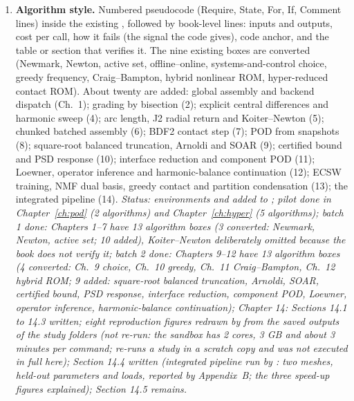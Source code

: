 \begin{enumerate}
\item \textbf{Algorithm style.} Numbered pseudocode (Require, State, For, If, Comment lines) inside the existing , followed by book-level lines: inputs and outputs, cost per call, how it fails (the signal the code gives), code anchor, and the table or section that verifies it. The nine existing boxes are converted (Newmark, Newton, active set, offline--online, systems-and-control choice, greedy frequency, Craig--Bampton, hybrid nonlinear ROM, hyper-reduced contact ROM). About twenty are added: global assembly and backend dispatch (Ch.~1); grading by bisection (2); explicit central differences and harmonic sweep (4); arc length, J2 radial return and Koiter--Newton (5); chunked batched assembly (6); BDF2 contact step (7); POD from snapshots (8); square-root balanced truncation, Arnoldi and SOAR (9); certified bound and PSD response (10); interface reduction and component POD (11); Loewner, operator inference and harmonic-balance continuation (12); ECSW training, NMF dual basis, greedy contact and partition condensation (13); the integrated pipeline (14). \emph{Status: environments  and  added to ; pilot done in Chapter~\ref{ch:pod} (2 algorithms) and Chapter~\ref{ch:hyper} (5 algorithms); batch 1 done: Chapters 1--7 have 13 algorithm boxes (3 converted: Newmark, Newton, active set; 10 added), Koiter--Newton deliberately omitted because the book does not verify it; batch 2 done: Chapters 9--12 have 13 algorithm boxes (4 converted: Ch.~9 choice, Ch.~10 greedy, Ch.~11 Craig--Bampton, Ch.~12 hybrid ROM; 9 added: square-root balanced truncation, Arnoldi, SOAR, certified bound, PSD response, interface reduction, component POD, Loewner, operator inference, harmonic-balance continuation); Chapter 14: Sections 14.1 to 14.3 written; eight reproduction figures redrawn by  from the saved outputs of the study folders (not re-run: the sandbox has 2 cores, 3 GB and about 3 minutes per command;  re-runs a study in a scratch copy and was not executed in full here); Section 14.4 written (integrated pipeline run by : two meshes, held-out parameters and loads, reported by Appendix~B; the three speed-up figures explained); Section 14.5 remains.}

\end{enumerate}
